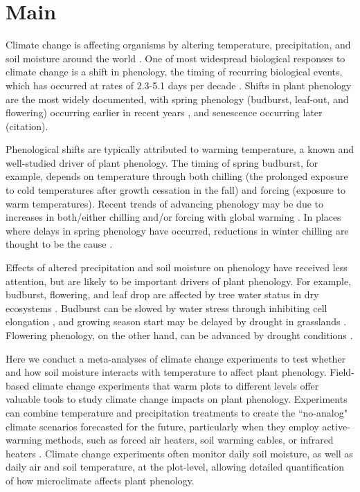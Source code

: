 \documentclass{article}
\begin{document}
\section* {Main}
\par Climate change is affecting organisms by altering temperature, precipitation, and soil moisture around the world \citep{parmesan2006,chen2010}. One of most widespread biological responses to climate change is a shift in phenology, the timing of recurring biological events, which has occurred at rates of 2.3-5.1 days per decade \citep{parmesan2006,poloczanska2013,root2003}. Shifts in plant phenology are the most widely documented, with spring phenology (budburst, leaf-out, and flowering) occurring earlier in recent years \citep{wolkovich2012}, and senescence occurring later (citation). 
\par Phenological shifts are typically attributed to warming temperature, a known and well-studied driver of plant phenology. The timing of spring budburst, for example, depends on temperature through both chilling (the prolonged exposure to cold temperatures after growth cessation in the fall) and forcing (exposure to warm temperatures). Recent trends of advancing phenology may be due to increases in both/either chilling and/or forcing with global warming \cite{fujisawa2010, ibanez2010,cook2012b}. In places where delays in spring phenology have occurred, reductions in winter chilling are thought to be the cause \cite{yu2010}. 
\par Effects of altered precipitation and soil moisture on phenology have received less attention, but are likely to be important drivers of plant phenology. For example, budburst, flowering, and leaf drop are affected by tree water status in dry ecosystems \citep{essiamah1986,reich1984, van1993}. Budburst can be slowed by water stress through inhibiting cell elongation \citep{essiamah1986}, and growing season start may be delayed by drought in grasslands \cite{cui2017}. Flowering phenology, on the other hand, can be advanced by drought conditions \citep{hamann2018}.
\par Here we conduct a meta-analyses of climate change experiments to test whether and how soil moisture interacts with temperature to affect plant phenology. Field-based climate change experiments that warm plots to different levels offer valuable tools to study climate change impacts on plant phenology. Experiments can combine temperature and precipitation treatments to create the ``no-analog" climate scenarios forecasted for the future, particularly when they employ active-warming methods, such as forced air heaters, soil warming cables, or infrared heaters \citep{shaver2000,williams2007b,aronson2009}. Climate change experiments often monitor daily soil moisture, as well as daily air and soil temperature, at the plot-level, allowing detailed quantification of how microclimate affects plant phenology. 
\end{document}
